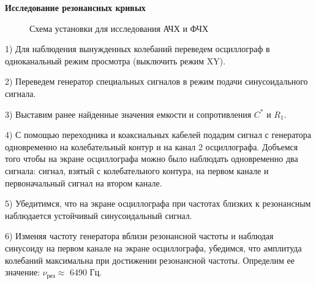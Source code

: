 \documentclass[a4paper,12pt]{article}
\begin{document}
\par \textbf{Исследование резонансных кривых}

\begin{center}
\begin{figure}
\caption{Схема установки для исследования АЧХ и ФЧХ}
\end{figure}
\end{center}

\par 1) Для наблюдения вынужденных колебаний переведем осциллограф в одноканальный режим просмотра (выключить режим XY). \\

\par 2) Переведем генератор специальных сигналов в режим подачи синусоидального сигнала. \\

\par 3) Выставим ранее найденные значения емкости и сопротивления $C^*$ и $R_1$. \\

\par 4) С помощью переходника и коаксиальных кабелей подадим сигнал с генератора одновременно на колебательный контур и на канал 2 осциллографа. Добъемся того чтобы на экране осциллографа можно было наблюдать одновременно два сигнала: сигнал, взятый с колебательного контура, на первом канале и первоначальный сигнал на втором канале.

\par 5) Убедитимся, что на экране осциллографа при частотах близких к резонансным наблюдается устойчивый синусоидальный сигнал.\\

\par 6) Изменяя частоту генератора вблизи резонансной частоты и наблюдая синусоиду на первом канале на экране осциллографа, убедимся, что амплитуда колебаний максимальна при достижении резонансной частоты. Определим ее значение: $\nu_{\text{рез}} \approx$ 6490 Гц. \\
\end{document}
